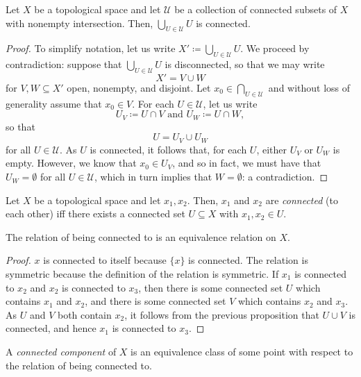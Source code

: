 \begin{prp}
Let $X$ be a topological space and let $\mathcal{U}$ be a collection of connected subsets of $X$ with nonempty intersection.  Then, $\bigcup _{U\in \mathcal{U}}U$ is connected.
\begin{proof}
To simplify notation, let us write $X'\coloneqq \bigcup _{U\in \mathcal{U}}U$.  We proceed by contradiction:  suppose that $\bigcup _{U\in \mathcal{U}}U$ is disconnected, so that we may write
\begin{equation}
X'=V\cup W
\end{equation}
for $V,W\subseteq X'$ open, nonempty, and disjoint.  Let $x_0\in \bigcap _{U\in \mathcal{U}}$ and without loss of generality assume that $x_0\in V$.  For each $U\in \mathcal{U}$, let us write
\begin{equation}
U_V\coloneqq U\cap V\text{ and }U_W\coloneqq U\cap W,
\end{equation}
so that
\begin{equation}
U=U_V\cup U_W
\end{equation}
for all $U\in \mathcal{U}$.  As $U$ is connected, it follows that, for each $U$, either $U_V$ or $U_W$ is empty.  However, we know that $x_0\in U_V$, and so in fact, we must have that $U_W=\emptyset$ for all $U\in \mathcal{U}$, which in turn implies that $W=\emptyset$:  a contradiction.
\end{proof}
\end{prp}
\begin{dfn}
Let $X$ be a topological space and let $x_1,x_2$.  Then, $x_1$ and $x_2$ are \emph{connected} (to each other) iff there exists a connected set $U\subseteq X$ with $x_1,x_2\in U$.
\begin{prp}
The relation of being connected to is an equivalence relation on $X$.
\begin{proof}
$x$ is connected to itself because $\{ x\}$ is connected.  The relation is symmetric because the definition of the relation is symmetric.  If $x_1$ is connected to $x_2$ and $x_2$ is connected to $x_3$, then there is some connected set $U$ which contains $x_1$ and $x_2$, and there is some connected set $V$ which contains $x_2$ and $x_3$.  As $U$ and $V$ both contain $x_2$, it follows from the previous proposition that $U\cup V$ is connected, and hence $x_1$ is connected to $x_3$.
\end{proof}
\end{prp}
A \emph{connected component} of $X$ is an equivalence class of some point with respect to the relation of being connected to.
\end{dfn}
